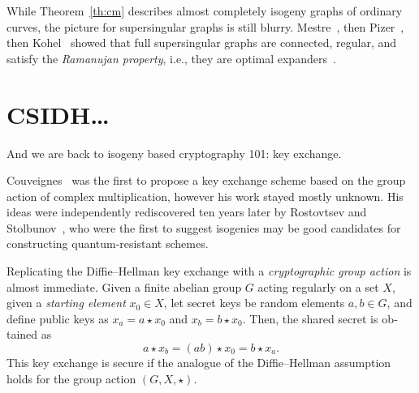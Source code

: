 \begin{otherlanguage}{english}
  While Theorem~\ref{th:cm} describes almost completely isogeny graphs
  of ordinary curves, the picture for supersingular graphs is still
  blurry. Mestre~\cite{mestre86}, then Pizer~\cite{pizer1,pizer2},
  then Kohel~\cite{kohel} showed that full supersingular graphs are
  connected, regular, and satisfy the \emph{Ramanujan property}, i.e.,
  they are optimal expanders~\cite{hoory2006expander}.

  
  \section{CSIDH\dots}
  And we are back to isogeny based cryptography 101: key exchange.

  Couveignes~\cite{cryptoeprint:2006:291} was the first to propose a
  key exchange scheme based on the group action of complex
  multiplication, however his work stayed mostly unknown. His ideas
  were independently rediscovered ten years later by Rostovtsev and
  Stolbunov~\cite{rostovtsev+stolbunov06}, who were the first to
  suggest isogenies may be good candidates for constructing
  quantum-resistant schemes.

  Replicating the Diffie--Hellman key exchange with a
  \emph{cryptographic group action} is almost immediate. Given a
  finite abelian group $G$ acting regularly on a set $X$, given a
  \emph{starting element} $x_0\in X$, let secret keys be random
  elements $a,b\in G$, and define public keys as $x_a = a\star x_0$
  and $x_b = b\star x_0$. Then, the shared secret is obtained as
  \[a\star x_b = (ab)\star x_0 = b\star x_a.\] %
  This key exchange is secure if the analogue of the Diffie--Hellman
  assumption holds for the group action $(G,X,\star)$.


\end{otherlanguage}
